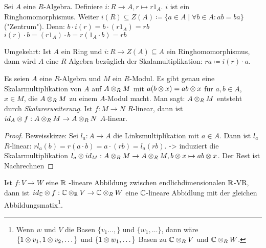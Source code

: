 \documentclass[../main.tex]{subfiles}
\begin{document}
\begin{remark}
    Sei $A$ eine $R$-Algebra. Definiere $i:R\rightarrow A, r\mapsto r1_A$.
    $i$ ist ein Ringhomomorphismus.
    Weiter $i(R)\subseteq Z(A)\coloneqq \{a\in A \mid \forall b \in A: ab = ba\}$ ("Zentrum").
    Denn: $b\cdot i(r) = b \cdot (r1_A) = rb$\\
    $i(r)\cdot b = (r1_A)\cdot b = r(1_A\cdot b) = rb$

    Umgekehrt:
    Ist $A$ ein Ring und $i:R\rightarrow Z(A) \subseteq A$ ein Ringhomomorphismus, dann wird $A$ eine $R$-Algebra bezüglich der Skalamultiplikation: $ra\coloneqq i(r)\cdot a$.
\end{remark}
\begin{theorem}[Skalarerweiterung]
    Es seien $A$ eine $R$-Algebra und $M$ ein $R$-Modul.
    Es gibt genau eine Skalarmultiplikation von $A$ auf $A\otimes_R M$ mit $a(b\otimes x) = ab \otimes x$ für $a,b\in A$, $x\in M$, die $A\otimes_R M$ zu einem $A$-Modul macht.
    Man sagt: $A\otimes_R M$ entsteht durch \emph{Skalarerweiterung}.
    Ist $f:M\rightarrow N$ $R$-linear, dann ist $id_A \otimes f: A\otimes_R M \rightarrow A\otimes_R N$ $A$-linear.
\end{theorem}
\begin{proof}
    Beweisskizze:
    Sei $l_a:A\rightarrow A$ die Linksmultiplikation mit $a\in A$. Dann ist $l_a$ $R$-linear:
    $rl_a(b) = r(a\cdot b) = a \cdot (rb) = l_a(rb).$
    -> induziert die Skalarmultiplikation $l_a\otimes id_M:A\otimes_R M\rightarrow A\otimes_R M, b\otimes x\mapsto ab\otimes x$.
    Der Rest ist Nachrechnen
\end{proof}
\begin{example}
    Ist $f:V\rightarrow W$ eine $\mathbb{R}$ -lineare Abbildung
    zwischen endlichdimensionalen $\mathbb{R}$-VR, dann ist $id_{\mathbb{C}} \otimes f: \mathbb{C}\otimes_{\mathbb{R}} V \rightarrow \mathbb{C}\otimes_R W$ eine $\mathbb{C}$-lineare Abbidlung mit der gleichen Abbildungsmatix\footnote{Wenn $w$ und $V$ die Basen $\{v_1\dots,\}$ und $\{w_1,\dots\}$, dann wäre $\{1\otimes v_1,1\otimes v_2,\dots\}$ und $\{1\otimes w_1,\dots\}$ Basen zu $\mathbb{C}\otimes_R V$ und $\mathbb{C}\otimes_R W$.}.
\end{example}
\end{document}
